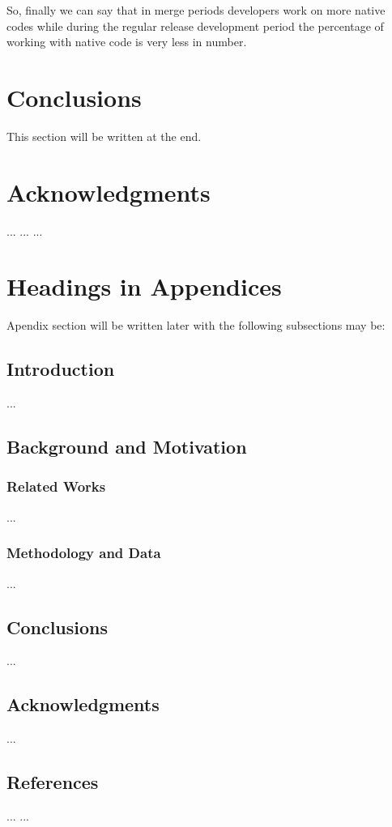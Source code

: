 \documentclass{acm_proc_article-sp}
\begin{document}
So, finally we can say that in merge periods developers work on more native codes while during the regular release development period the percentage of working with native code is very less in number.

\section{Conclusions}
This section will be written at the end.

\section{Acknowledgments}
... ... ...

 
\appendix
\section{Headings in Appendices}
Apendix section will be written later with the following subsections may be:
\subsection{Introduction}
...
\subsection{Background and Motivation}
\subsubsection{Related Works}
...
\subsubsection{Methodology and Data}
...
\subsection{Conclusions}
...
\subsection{Acknowledgments}
...

\subsection{References}
... ...

\balancecolumns
\end{document}
